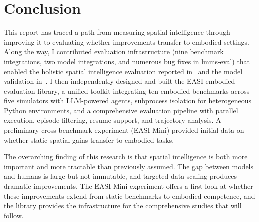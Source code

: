 \chapter{Conclusion}
\label{sec:conclusion}

This report has traced a path from measuring spatial intelligence through improving it to evaluating whether improvements transfer to embodied settings. Along the way, I contributed evaluation infrastructure (nine benchmark integrations, two model integrations, and numerous bug fixes in lmms-eval) that enabled the holistic spatial intelligence evaluation reported in~\cite{cai2025holisticevaluationmultimodalllms} and the model validation in~\cite{cai2025scalingspatialintelligencemultimodal}. I then independently designed and built the EASI embodied evaluation library, a unified toolkit integrating ten embodied benchmarks across five simulators with LLM-powered agents, subprocess isolation for heterogeneous Python environments, and a comprehensive evaluation pipeline with parallel execution, episode filtering, resume support, and trajectory analysis. A preliminary cross-benchmark experiment (EASI-Mini) provided initial data on whether static spatial gains transfer to embodied tasks.

The overarching finding of this research is that spatial intelligence is both more important and more tractable than previously assumed. The gap between models and humans is large but not immutable, and targeted data scaling produces dramatic improvements. The EASI-Mini experiment offers a first look at whether these improvements extend from static benchmarks to embodied competence, and the library provides the infrastructure for the comprehensive studies that will follow.
